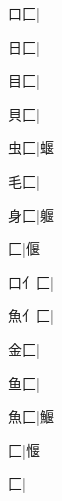 \begin{multicols}{2}
{{\cjk{}{\cnsym{}　}口匚}|{}\par
{\cjk{}{\cnsym{}　}日匚}|{}\par
{\cjk{}{\cnsym{}　}目匚}|{}\par
{\cjk{}{\cnsym{}　}貝匚}|{}\par
{\cjk{}{\cnsym{}　}虫匚}|{\cjk{}蝘}\par
{\cjk{}{\cnsym{}　}毛匚}|{}\par
{\cjk{}{\cnsym{}　}身匚}|{\cjk{}躽}\par
{匚}|{\cjk{}偃}\par
{\cjk{}口{亻}匚}|{}\par
{\cjk{}魚{亻}匚}|{}\par
{\cjk{}{\cnsym{}　}金匚}|{}\par
{\cjk{}{\cnsym{}　}鱼匚}|{}\par
{\cjk{}{\cnsym{}　}魚匚}|{\cjk{}鰋}\par
{匚}|{\cjk{}愝}\par
{匚}|{}\par
}
\end{multicols}
